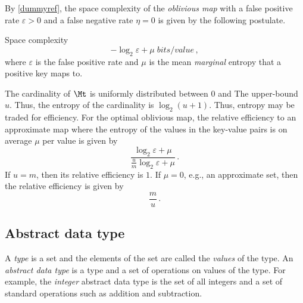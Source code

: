 \documentclass[ ../main.tex]{subfiles}
\begin{document}
By \cref{dummyref}, the space complexity of the \emph{oblivious map} with a false positive rate $\varepsilon > 0$ and a false negative rate $\eta = 0$ is given by the following postulate.
\begin{postulate}
Space complexity
\begin{equation}
    -\log_2 \varepsilon + \mu \; \si{bits \per value}\,,
\end{equation}
where $\varepsilon$ is the false positive rate and $\mu$ is the mean \emph{marginal} entropy that a positive key maps to.
\end{postulate}

The cardinality of $\Mt$ is uniformly distributed between $0$ and The upper-bound $u$. Thus, the entropy of the cardinality is $\log_2(u+1)$. Thus, entropy may be traded for efficiency. For the optimal oblivious map, the relative efficiency to an approximate map where the entropy of the values in the key-value pairs is on average $\mu$ per value is given by
\begin{equation}
    \frac{\log_2 \varepsilon + \mu}{\frac{u}{m}\log_2 \varepsilon + \mu}\,.
\end{equation}
If $u = m$, then its relative efficiency is $1$. If $\mu = 0$, e.g., an approximate set, then the relative efficiency is given by
\begin{equation}
    \frac{m}{u}\,.
\end{equation}

\subsection{Abstract data type}
A \emph{type} is a set and the elements of the set are called the \emph{values} of the type. An \emph{abstract data type} is a type and a set of operations on values of the type. For example, the \emph{integer} abstract data type is the set of all integers and a set of standard operations such as addition and subtraction.
\end{document}
